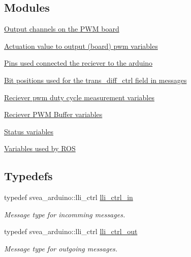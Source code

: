 \subsection*{Modules}
\begin{DoxyCompactItemize}
\item 
\hyperlink{group__PwmOutputChannels}{Output channels on the P\+W\+M board}
\item 
\hyperlink{group__ActuationToOutput}{Actuation value to output (board) pwm variables}
\item 
\hyperlink{group__RecieverPwmPins}{Pins used connected the reciever to the arduino}
\item 
\hyperlink{group__MsgBitPositions}{Bit positions used for the trans\+\_\+diff\+\_\+ctrl field in messages}
\item 
\hyperlink{group__PwmMeasurtement}{Reciever pwm duty cycle measurement variables}
\item 
\hyperlink{group__PwmBuffers}{Reciever P\+W\+M Buffer variables}
\item 
\hyperlink{group__StatusVariables}{Status variables}
\item 
\hyperlink{group__ROSSetup}{Variables used by R\+OS}
\end{DoxyCompactItemize}
\subsection*{Typedefs}
\begin{DoxyCompactItemize}
\item 
typedef svea\+\_\+arduino\+::lli\+\_\+ctrl \hyperlink{group__GlobalVariables_ga397644608f772ef60685f6a938f43ea1}{lli\+\_\+ctrl\+\_\+in}\hypertarget{group__GlobalVariables_ga397644608f772ef60685f6a938f43ea1}{}\label{group__GlobalVariables_ga397644608f772ef60685f6a938f43ea1}

\begin{DoxyCompactList}\small\item\em Message type for incomming messages. \end{DoxyCompactList}\item 
typedef svea\+\_\+arduino\+::lli\+\_\+ctrl \hyperlink{group__GlobalVariables_ga6b033df4aed2c02e82dc2962f73c2ccb}{lli\+\_\+ctrl\+\_\+out}\hypertarget{group__GlobalVariables_ga6b033df4aed2c02e82dc2962f73c2ccb}{}\label{group__GlobalVariables_ga6b033df4aed2c02e82dc2962f73c2ccb}

\begin{DoxyCompactList}\small\item\em Message type for outgoing messages. \end{DoxyCompactList}\end{DoxyCompactItemize}
